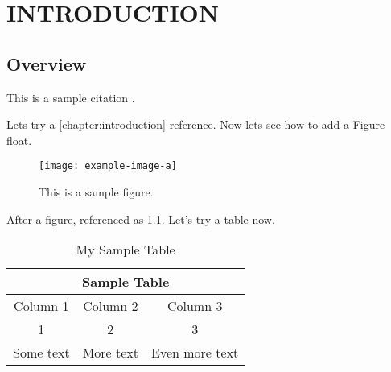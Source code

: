 \chapter{INTRODUCTION\label{chapter:introduction}}

\lipsum

\section{Overview\label{sec:overview}}

\lipsum[1]

This is a sample citation \autocite{Bob2011}.
\lipsum[2]

Lets try a \cref{chapter:introduction} reference.
Now lets see how to add a Figure float.

\begin{figure}
    \centering %
    \texttt{[image: example-image-a]} %
    \caption{This is a sample figure.\label{fig:samplefigure}} %
\end{figure}

After a figure, referenced as \cref{fig:samplefigure}.
Let's try a table now.
\begin{table}
    \centering
    \caption{My Sample Table\label{tab:sampletable}}
    \begin{tabular}{c c c}
        \toprule
        \multicolumn{3}{c}{Sample Table} \\
        \midrule
        Column 1 & Column 2 & Column 3 \\
        \midrule
        1 & 2 & 3 \\  
        Some text & More text & Even more text \\
        \bottomrule
    \end{tabular}
\end{table}
